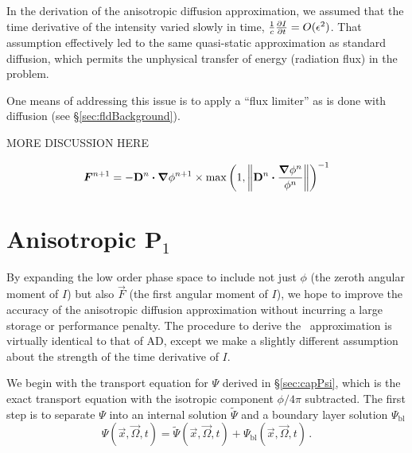 In the derivation of the anisotropic diffusion approximation, we assumed that
the time derivative of the intensity varied slowly in time,
$\frac{1}{c}\frac{\partial I}{\partial t} = O(\epsilon^2)$. That assumption effectively led to
the same quasi-static approximation as standard diffusion, which permits the
unphysical transfer of energy (radiation flux) in the problem.

One means of addressing this issue is to apply a ``flux limiter'' as is done
with diffusion (see \S\ref{sec:fldBackground}).

MORE DISCUSSION HERE

\begin{equation*}
  \bm{F}^{n+1} = -\mathbf{D}^{n}\bm{\cdot} \bm{\nabla} \phi^{n+1} \times 
  \max\left( 1, \left\| \mathbf{D}^{n}\bm{\cdot} \frac{\bm{\nabla} \phi^{n}}{\phi^{n}} \right\|
  \right)^{-1}
\end{equation*}

\section{Anisotropic P$_1$}

By expanding the low order phase space to include not just $\phi$ (the
zeroth angular moment of $I$) but also $\vec{F}$ (the first angular moment of
$I$), we hope to improve the accuracy of the anisotropic diffusion approximation
without incurring a large storage or performance penalty. The procedure to
derive the \APone\ approximation is virtually identical to that of AD, except we
make a slightly different assumption about the strength of the time derivative
of $I$.

We begin with the transport equation for $\Psi$ derived in \S\ref{sec:capPsi},
which is the exact transport equation with the isotropic component $\phi/4\pi$
subtracted. 
The first step is to separate $\Psi$ into an internal solution $\tilde\Psi$ and
a boundary layer solution
$\Psi_\mathrm{bl}$
\begin{equation} \label{eq:ap1boundaryLayerPsi}
  \Psi(\vec{x}, \vec{\Omega}, t)
  = \tilde\Psi(\vec{x}, \vec{\Omega}, t)
  + \Psi_\mathrm{bl}(\vec{x}, \vec{\Omega}, t)\,.
\end{equation}

